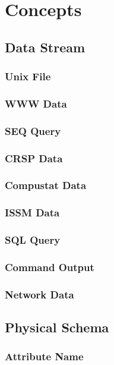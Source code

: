 \newpage

\section{\Devise Concepts}

\subsection{Data Stream}

\subsubsection{Unix File}
\subsubsection{WWW Data}
\subsubsection{SEQ Query}
\subsubsection{CRSP Data}
\subsubsection{Compustat Data}
\subsubsection{ISSM Data}
\subsubsection{SQL Query}
\subsubsection{Command Output}
\subsubsection{Network Data}

\subsection{Physical Schema}

\subsubsection{Attribute Name}
